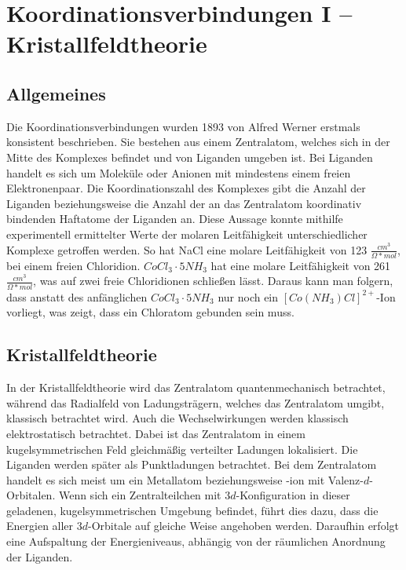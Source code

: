 \section{Koordinationsverbindungen I -- Kristallfeldtheorie}
\subsection{Allgemeines}

Die Koordinationsverbindungen wurden 1893 von Alfred Werner erstmals konsistent beschrieben. 
\cite{Werner1893}
Sie bestehen aus einem Zentralatom, welches sich in der Mitte des Komplexes befindet und von Liganden umgeben ist.
 Bei Liganden handelt es sich um Moleküle oder Anionen mit mindestens einem freien Elektronenpaar. Die Koordinationszahl des Komplexes gibt die Anzahl der Liganden beziehungsweise die Anzahl der an das Zentralatom koordinativ bindenden 
Haftatome der Liganden an. 
Diese Aussage konnte mithilfe experimentell ermittelter Werte der molaren Leitfähigkeit unterschiedlicher Komplexe getroffen werden.
So hat NaCl eine molare Leitfähigkeit von 123 $\frac{cm^3}{\Omega*mol}$, bei einem freien Chloridion. $CoCl_3\cdot5NH_3$ hat eine molare Leitfähigkeit von 261$\frac{cm^3}{\Omega*mol}$, was auf zwei freie Chloridionen schließen lässt. Daraus kann man folgern, dass anstatt des anfänglichen $CoCl_3\cdot5NH_3$ nur noch ein $ [Co(NH_{3})Cl]^{2+} $-Ion vorliegt, was zeigt, dass ein Chloratom gebunden sein muss.
\subsection{Kristallfeldtheorie}
In der Kristallfeldtheorie wird das Zentralatom quantenmechanisch betrachtet,
während das Radialfeld von Ladungsträgern, welches das Zentralatom umgibt, klassisch betrachtet wird. Auch die Wechselwirkungen werden klassisch elektrostatisch betrachtet.
Dabei ist das Zentralatom in einem kugelsymmetrischen Feld gleichmäßig verteilter Ladungen lokalisiert.
Die Liganden werden später als Punktladungen betrachtet.
Bei dem Zentralatom handelt es sich meist um ein Metallatom beziehungsweise -ion mit Valenz-$d$-Orbitalen.
Wenn sich ein Zentralteilchen mit 3$d$-Konfiguration in dieser geladenen, kugelsymmetrischen Umgebung  befindet, führt dies dazu, dass die Energien aller 3$d$-Orbitale auf gleiche Weise angehoben werden. Daraufhin erfolgt eine Aufspaltung der Energieniveaus, abhängig von der räumlichen Anordnung der Liganden.
